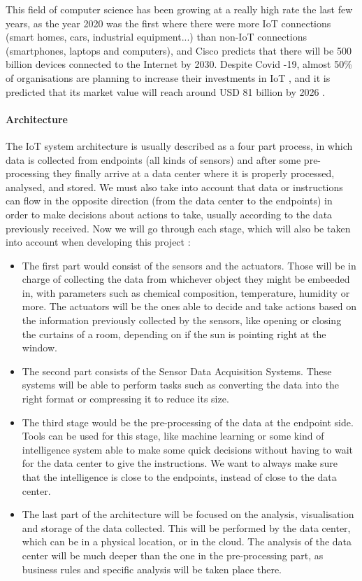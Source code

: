 \documentclass{article}
\begin{document}
This field of computer science has been growing at a really high rate the last few years, as the year 2020 was the first where there were more IoT connections (smart homes, cars, industrial equipment...) than non-IoT connections (smartphones, laptops and computers), and Cisco predicts that there will be 500 billion devices connected to the Internet by 2030. Despite Covid -19, almost 50\% of organisations are planning to increase their investments in IoT \cite{gartner:covid}, and it is predicted that its market value will reach around USD 81 billion by 2026 \cite{mordor}.   

\paragraph*{Architecture\newline\newline}

The IoT system architecture is usually described as a four part process, in which data is collected from endpoints (all kinds of sensors) and after some pre-processing they finally arrive at a data center where it is properly processed, analysed, and stored. We must also take into account that data or instructions can flow in the opposite direction (from the data center to the endpoints) in order to make decisions about actions to take, usually according to the data previously received. Now we will go through each stage, which will also be taken into account when developing this project \cite{digi}\cite{marlabs}:

\begin{itemize}
    \item The first part would consist of the sensors and the actuators. Those will be in charge of collecting the data from whichever object they might be embeeded in, with parameters such as chemical composition, temperature, humidity or more. The actuators will be the ones able to decide and take actions based on the information previously collected by the sensors, like opening or closing the curtains of a room, depending on if the sun is pointing right at the window. 
    \item The second part consists of the Sensor Data Acquisition Systems. These systems will be able to perform tasks such as converting the data into the right format or compressing it to reduce its size.
    \item The third stage would be the pre-processing of the data at the endpoint side. Tools can be used for this stage, like machine learning or some kind of intelligence system able to make some quick decisions without having to wait for the data center to give the instructions. We want to always make sure that the intelligence is close to the endpoints, instead of close to the data center. 
    \item The last part of the architecture will be focused on the analysis, visualisation and storage of the data collected. This will be performed by the data center, which can be in a physical location, or in the cloud. The analysis of the data center will be much deeper than the one in the pre-processing part, as business rules and specific analysis will be taken place there.
\end{itemize}
\end{document}
